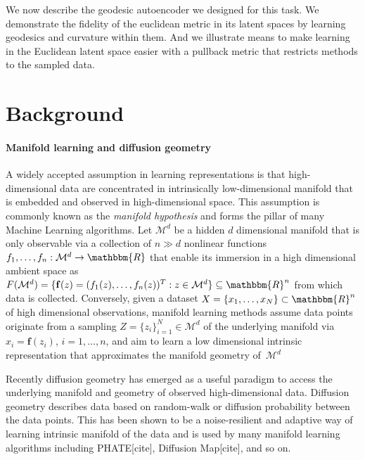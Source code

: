 \documentclass{article}
\theoremstyle{plain}
\theoremstyle{definition}
\theoremstyle{remark}
\begin{document}
We now describe the geodesic autoencoder we designed for this task. We demonstrate the fidelity of the euclidean metric in its latent spaces by learning geodesics and curvature within them. And we illustrate means to make learning in the Euclidean latent space easier with a pullback metric that restricts methods to the sampled data.

\section{Background}
\paragraph{Manifold learning and diffusion geometry}
A widely accepted assumption in learning representations is that high-dimensional data are concentrated in intrinsically low-dimensional manifold that is embedded and observed in high-dimensional space. This assumption is commonly known as the \textit{manifold hypothesis} and forms the pillar of many Machine Learning algorithms. Let $\mathcal{M}^d$ be a hidden $d$ dimensional manifold that is only observable via a collection of $n \gg d$ nonlinear functions $f_1,\ldots,f_n : \mathcal{M}^d \to \mathbbm{R}$ that enable its immersion in a high dimensional ambient space as $F(\mathcal{M}^d) = \{\mathbf{f}(z) = (f_1(z),\ldots,f_n(z))^T : z \in \mathcal{M}^d \} \subseteq \mathbbm{R}^n$ from which data is collected. Conversely, given a dataset $X = \{x_1, \ldots, x_N\} \subset \mathbbm{R}^n$ of high dimensional observations, manifold learning methods assume data points originate from a sampling $Z = \{z_i\}_{i=1}^N \in \mathcal{M}^d$ of the underlying manifold via $x_i = \mathbf{f}(z_i)$, $i = 1, \ldots, n$, and aim to learn a low dimensional intrinsic representation that approximates the manifold geometry of~$\mathcal{M}^d$

Recently diffusion geometry has emerged as a useful paradigm to access the underlying manifold and geometry of observed high-dimensional data. Diffusion geometry describes data based on random-walk or diffusion probability between the data points. This has been shown to be a noise-resilient and adaptive way of learning intrinsic manifold of the data and is used by many manifold learning algorithms including PHATE[cite], Diffusion Map[cite], and so on. 
\end{document}

